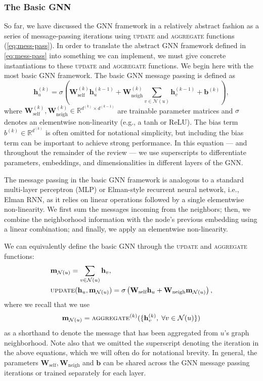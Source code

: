 \documentclass[10pt]{book}
\begin{document}
\subsubsection{The Basic GNN}

So far, we have discussed the GNN framework in a relatively abstract fashion as a series of message-passing iterations using \textsc{update} and \textsc{aggregate} functions (\autoref{eq:mess-pass}). In order to translate the abstract GNN framework defined in \autoref{eq:mess-pass} into something we can implement, we must give concrete instantiations to these \textsc{update} and \textsc{aggregate} functions. We begin here with the most basic GNN framework. The basic GNN message passing is defined as
\begin{equation}
    \mathbf h^{(k)}_u = \sigma \left( \mathbf W^{(k)}_\text{self} \mathbf h_u^{(k-1)} + \mathbf W_\text{neigh}^{(k)} \sum_{v \in \mathcal N(u)} \mathbf h^{(k-1)}_v + \mathbf b^{(k)} \right),
\end{equation}
where $\mathbf W^{(k)}_\text{self}, \mathbf W_\text{neigh}^{(k)} \in \mathbb R^{d^{(k)} \times d^{(k-1)}}$ are trainable parameter matrices and $\sigma$ denotes an elementwise non-linearity (e.g., a tanh or ReLU). The bias term $b^{(k)} \in \mathbb R^{d^{(k)}}$ is often omitted for notational simplicity, but including the bias term can be important to achieve strong performance. In this equation --- and throughout the remainder of the review --- we use superscripts to differentiate parameters, embeddings, and dimensionalities in different layers of the GNN.

The message passing in the basic GNN framework is analogous to a standard multi-layer perceptron (MLP) or Elman-style recurrent neural network, i.e., Elman RNN, as it relies on linear operations followed by a single elementwise non-linearity. We first sum the messages incoming from the neighbors; then, we combine the neighborhood information with the node's previous embedding using a linear combination; and finally, we apply an elementwise non-linearity.

We can equivalently define the basic GNN through the \textsc{update} and \textsc{aggregate} functions:
\begin{align}
    &\mathbf m_{\mathcal N(u)} = \sum_{v \in \mathcal N(u)} \mathbf h_v, 
    \label{eq:basicgnn} \\
    &\textsc{update}(\mathbf h_u, \mathbf m_{\mathcal N(u)}) = \sigma \left( \mathbf W_\text{self} \mathbf h_u + \mathbf W_\text{neigh} \mathbf m_{\mathcal N(u)} \right),
\end{align}
where we recall that we use
\begin{equation}
    \mathbf m_{\mathcal N(u)} = \textsc{aggregate}^{(k)}(\{ \mathbf h_v^{(k)}, \; \forall v \in \mathcal N(u)\})
\end{equation}
as a shorthand to denote the message that has been aggregated from $u$'s graph neighborhood. Note also that we omitted the superscript denoting the iteration in the above equations, which we will often do for notational brevity. In general, the parameters $\mathbf W_\text{self}, \mathbf W_\text{neigh}$ and $\mathbf b$ can be shared across the GNN message passing iterations or trained separately for each layer.
\end{document}
